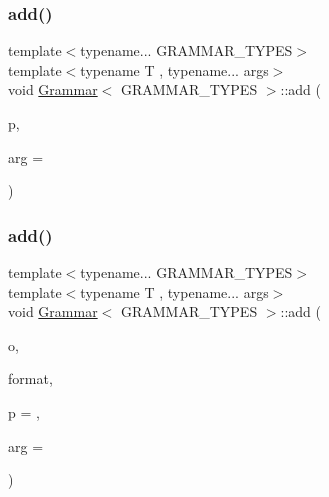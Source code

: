 \mbox{\label{class_grammar_a52b751ef5987563d4045692199dba16c}} 
\subsubsection{\texorpdfstring{add()}{add()}\hspace{0.1cm}{\footnotesize\ttfamily [4/5]}}
{\footnotesize\ttfamily template$<$typename... G\+R\+A\+M\+M\+A\+R\+\_\+\+T\+Y\+P\+ES$>$ \\
template$<$typename T , typename... args$>$ \\
void \hyperlink{class_grammar}{Grammar}$<$ G\+R\+A\+M\+M\+A\+R\+\_\+\+T\+Y\+P\+ES $>$\+::add (\begin{DoxyParamCaption}\item[{\hyperlink{struct_builtin_primitive}{Builtin\+Primitive}$<$ T, args... $>$}]{p,  }\item[{const int}]{arg = {} }\end{DoxyParamCaption})\hspace{0.3cm}{\ttfamily [inline]}}

\mbox{\label{class_grammar_ada3a7374f7aa01a1db5b938e8b9dfa2d}} 
\subsubsection{\texorpdfstring{add()}{add()}\hspace{0.1cm}{\footnotesize\ttfamily [5/5]}}
{\footnotesize\ttfamily template$<$typename... G\+R\+A\+M\+M\+A\+R\+\_\+\+T\+Y\+P\+ES$>$ \\
template$<$typename T , typename... args$>$ \\
void \hyperlink{class_grammar}{Grammar}$<$ G\+R\+A\+M\+M\+A\+R\+\_\+\+T\+Y\+P\+ES $>$\+::add (\begin{DoxyParamCaption}\item[{\hyperlink{_instruction_8h_af2fb7c87c5854c5733d7bb0506b06de7}{Builtin\+Op}}]{o,  }\item[{std\+::string}]{format,  }\item[{const double}]{p = {},  }\item[{const int}]{arg = {} }\end{DoxyParamCaption})\hspace{0.3cm}{\ttfamily [inline]}}

